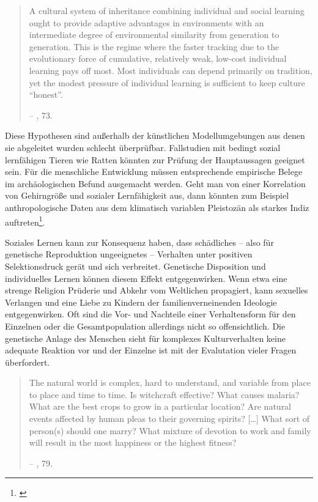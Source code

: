 \documentclass[openany,twoside,twocolumn]{book}
\let\rmarkdownfootnote\footnote%
\def\footnote{\protect\rmarkdownfootnote}
\begin{document}
\begin{quote}
A cultural system of inheritance combining individual and social
learning ought to provide adaptive advantages in environments with an
intermediate degree of environmental similarity from generation to
generation. This is the regime where the faster tracking due to the
evolutionary force of cumulative, relatively weak, low-cost individual
learning pays off most. Most individuals can depend primarily on
tradition, yet the modest pressure of individual learning is sufficient
to keep culture ``honest''.

-- \textcite{smith_cultural_1992}, 73.
\end{quote}

Diese Hypothesen sind außerhalb der künstlichen Modellumgebungen aus
denen sie abgeleitet wurden schlecht überprüfbar. Fallstudien mit
bedingt sozial lernfähigen Tieren wie Ratten könnten zur Prüfung der
Hauptaussagen geeignet sein. Für die menschliche Entwicklung müssen
entsprechende empirische Belege im archäologischen Befund ausgemacht
werden. Geht man von einer Korrelation von Gehirngröße und sozialer
Lernfähigkeit aus, dann könnten zum Beispiel anthropologische Daten aus
dem klimatisch variablen Pleistozän als starkes Indiz
auftreten\footnote{\textcite{smith_cultural_1992}}.

Soziales Lernen kann zur Konsequenz haben, dass schädliches -- also für
genetische Reproduktion ungeeignetes -- Verhalten unter positiven
Selektionsdruck gerät und sich verbreitet. Genetische Disposition und
individuelles Lernen können diesem Effekt entgegenwirken. Wenn etwa eine
strenge Religion Prüderie und Abkehr vom Weltlichen propagiert, kann
sexuelles Verlangen und eine Liebe zu Kindern der familienverneinenden
Ideologie entgegenwirken. Oft sind die Vor- und Nachteile einer
Verhaltensform für den Einzelnen oder die Gesamtpopulation allerdings
nicht so offensichtlich. Die genetische Anlage des Menschen sieht für
komplexes Kulturverhalten keine adequate Reaktion vor und der Einzelne
ist mit der Evalutation vieler Fragen überfordert.

\begin{quote}
The natural world is complex, hard to understand, and variable from
place to place and time to time. Is witchcraft effective? What causes
malaria? What are the best crops to grow in a particular location? Are
natural events affected by human pleas to their governing spirits?
{[}\ldots{}{]} What sort of person(s) should one marry? What mixture of
devotion to work and family will result in the most happiness or the
highest fitness?

-- \textcite{smith_cultural_1992}, 79.
\end{quote}
\end{document}
